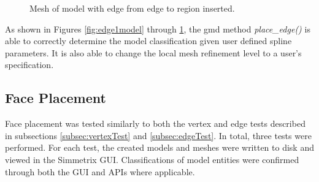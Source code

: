 \documentclass[a4paper, 12pt]{article}
\begin{document}
\begin{figure}[H]
  \centering
  \caption{Mesh of model with edge from edge to region inserted.}
  \label{fig:edge4mesh}
\end{figure}

As shown in Figures \ref{fig:edge1model} through \ref{fig:edge4mesh}, 
the gmd method \emph{place\_edge()} is able to correctly determine 
the model classification given user defined spline parameters. It is also 
able to change the local mesh refinement level to a user's specification. 

\subsection{Face Placement} \label{subsec:faceTest}
Face placement was tested similarly to both the vertex and edge
tests described in subsections 
\ref{subsec:vertexTest} and \ref{subsec:edgeTest}.
In total, three tests were performed. For each test, the created 
models and meshes were written to disk and viewed in the Simmetrix GUI.
Classifications of model entities were confirmed through both the GUI and 
APIs where applicable.
\end{document}
